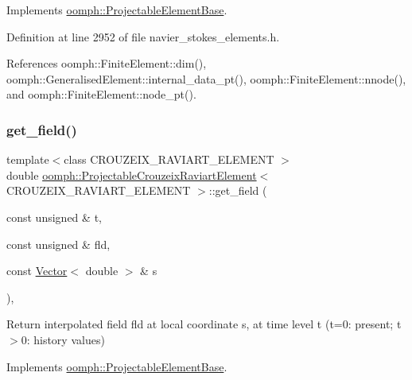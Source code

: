 Implements \hyperlink{classoomph_1_1ProjectableElementBase_a644306ebdf16f334344c2d27d72f18b7}{oomph\+::\+Projectable\+Element\+Base}.



Definition at line 2952 of file navier\+\_\+stokes\+\_\+elements.\+h.



References oomph\+::\+Finite\+Element\+::dim(), oomph\+::\+Generalised\+Element\+::internal\+\_\+data\+\_\+pt(), oomph\+::\+Finite\+Element\+::nnode(), and oomph\+::\+Finite\+Element\+::node\+\_\+pt().

\mbox{\label{classoomph_1_1ProjectableCrouzeixRaviartElement_a7a344f2a19106f7c46f75d97c2cc5afd}} 
\subsubsection{\texorpdfstring{get\+\_\+field()}{get\_field()}}
{\footnotesize\ttfamily template$<$class C\+R\+O\+U\+Z\+E\+I\+X\+\_\+\+R\+A\+V\+I\+A\+R\+T\+\_\+\+E\+L\+E\+M\+E\+NT $>$ \\
double \hyperlink{classoomph_1_1ProjectableCrouzeixRaviartElement}{oomph\+::\+Projectable\+Crouzeix\+Raviart\+Element}$<$ C\+R\+O\+U\+Z\+E\+I\+X\+\_\+\+R\+A\+V\+I\+A\+R\+T\+\_\+\+E\+L\+E\+M\+E\+NT $>$\+::get\+\_\+field (\begin{DoxyParamCaption}\item[{const unsigned \&}]{t,  }\item[{const unsigned \&}]{fld,  }\item[{const \hyperlink{classoomph_1_1Vector}{Vector}$<$ double $>$ \&}]{s }\end{DoxyParamCaption})\hspace{0.3cm}{\ttfamily [inline]}, {\ttfamily [virtual]}}



Return interpolated field fld at local coordinate s, at time level t (t=0\+: present; t$>$0\+: history values) 



Implements \hyperlink{classoomph_1_1ProjectableElementBase_ae4da5b565b6d333be2f5920f7be763cd}{oomph\+::\+Projectable\+Element\+Base}.



